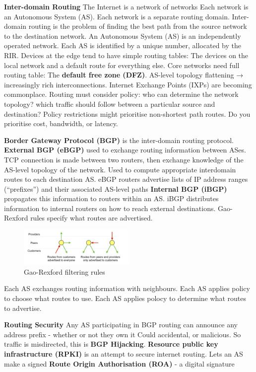 \documentclass{article}
\begin{document}
\vspace{\baselineskip}
\textbf{Inter-domain Routing}
The Internet is a network of networks
Each network is an Autonomous System (AS).
Each network is a separate routing domain.
Inter-domain routing is the problem of finding the best path from the source network to the destination network.
An Autonomous System (AS) is an independently operated network.
Each AS is identified by a unique number, allocated by the RIR\@.
Devices at the edge tend to have simple routing tables: The devices on the local network and a default route for everything else.
Core networks need full routing table: The \textbf{default free zone (DFZ)}.
AS-level topology flattening → increasingly rich interconnections.
Internet Exchange Points (IXPs) are becoming commonplace.
Routing must consider policy: who can determine the network topology? which traffic should follow between a particular source and destination?
Policy restrictions might prioritise non-shortest path routes. Do you prioritise cost, bandwidth, or latency.

\textbf{Border Gateway Protocol (BGP)} is the inter-domain routing protocol.
\textbf{External BGP (eBGP)} used to exchange routing information between ASes.
TCP connection is made between two routers, then exchange knowledge of the AS-level topology of the network.
Used to compute appropriate interdomain routes to each destination AS\@.
eBGP routers advertise lists of IP address ranges (“prefixes”) and their associated AS-level paths
\textbf{Internal BGP (iBGP)} propagates this information to routers within an AS\@.
iBGP distributes information to internal routers on how to reach external destinations.
Gao-Rexford rules specify what routes are advertised.

\begin{figure}[h]
    \centering
    \includegraphics[width=0.5\textwidth]{assets/gao-rexford-filtering-rules.png}
    \caption{Gao-Rexford filtering rules}\label{fig:gao-rexford}
\end{figure}

Each AS exchanges routing information with neighbours.
Each AS applies policy to choose what routes to use.
Each AS applies polocy to determine what routes to advertise.

\vspace{\baselineskip}
\textbf{Routing Security}
Any AS participating in BGP routing can announce any address prefix {-} whether or not they own it
Could accidental, or malicious.
So traffic is misdirected, this is \textbf{BGP Hijacking}.
\textbf{Resource public key infrastructure (RPKI)} is an attempt to secure internet routing.
Lets an AS make a signed \textbf{Route Origin Authorisation (ROA)} {-} a digital signature
\end{document}
